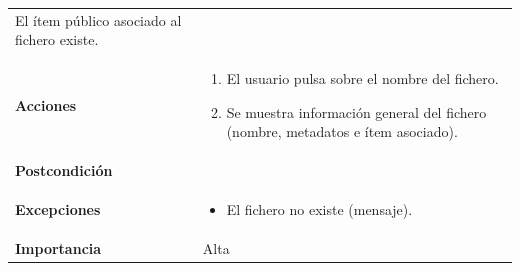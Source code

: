 \documentclass[
]{article}
\providecommand{\tightlist}{%
  \setlength{\itemsep}{0pt}\setlength{\parskip}{0pt}}
\begin{document}
\begin{longtable}[]{@{}ll@{}}
\begin{minipage}[t]{0.71\columnwidth}
El ítem público asociado al fichero existe.\strut
\end{minipage}\tabularnewline
\begin{minipage}[t]{0.23\columnwidth}\raggedright
\textbf{Acciones}\strut
\end{minipage} & \begin{minipage}[t]{0.71\columnwidth}\raggedright
\begin{enumerate}
\def\labelenumi{\arabic{enumi}.}
\tightlist
\item
  El usuario pulsa sobre el nombre del fichero.
\item
  Se muestra información general del fichero (nombre, metadatos e ítem
  asociado).
\end{enumerate}\strut
\end{minipage}\tabularnewline
\begin{minipage}[t]{0.23\columnwidth}\raggedright
\textbf{Postcondición}\strut
\end{minipage} & \begin{minipage}[t]{0.71\columnwidth}\raggedright
\strut
\end{minipage}\tabularnewline
\begin{minipage}[t]{0.23\columnwidth}\raggedright
\textbf{Excepciones}\strut
\end{minipage} & \begin{minipage}[t]{0.71\columnwidth}\raggedright
\begin{itemize}
\tightlist
\item
  El fichero no existe (mensaje).
\end{itemize}\strut
\end{minipage}\tabularnewline
\begin{minipage}[t]{0.23\columnwidth}\raggedright
\textbf{Importancia}\strut
\end{minipage} & \begin{minipage}[t]{0.71\columnwidth}\raggedright
Alta\strut
\end{minipage}\tabularnewline
\bottomrule
\end{longtable}
\end{document}
